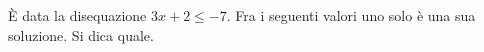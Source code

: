 È data la disequazione  $3x+2 \leq -7$. Fra i seguenti valori uno 
solo è una sua soluzione. Si dica quale.
